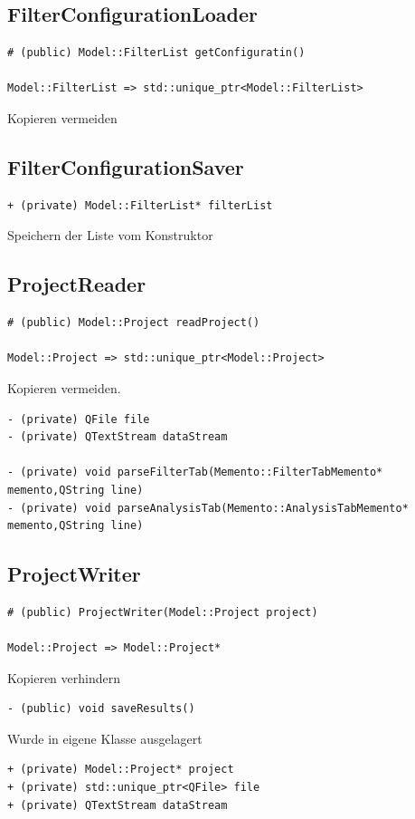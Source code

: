 \documentclass[parskip=full]{scrartcl}
\begin{document}
\subsection{FilterConfigurationLoader}
\begin{verbatim}
# (public) Model::FilterList getConfiguratin()

Model::FilterList => std::unique_ptr<Model::FilterList>
\end{verbatim}
Kopieren vermeiden
\subsection{FilterConfigurationSaver}
\begin{verbatim}
+ (private) Model::FilterList* filterList
\end{verbatim}
Speichern der Liste vom Konstruktor
\subsection{ProjectReader}
\begin{verbatim}
# (public) Model::Project readProject()

Model::Project => std::unique_ptr<Model::Project>
\end{verbatim}
Kopieren vermeiden.
\begin{verbatim}
- (private) QFile file
- (private) QTextStream dataStream

- (private) void parseFilterTab(Memento::FilterTabMemento* memento,QString line)
- (private) void parseAnalysisTab(Memento::AnalysisTabMemento* memento,QString line)
\end{verbatim}
\subsection{ProjectWriter}
\begin{verbatim}
# (public) ProjectWriter(Model::Project project)

Model::Project => Model::Project*
\end{verbatim}
Kopieren verhindern

\begin{verbatim}
- (public) void saveResults()
\end{verbatim}
Wurde in eigene Klasse ausgelagert
\begin{verbatim}
+ (private) Model::Project* project
+ (private) std::unique_ptr<QFile> file
+ (private) QTextStream dataStream
\end{verbatim}
\end{document}
